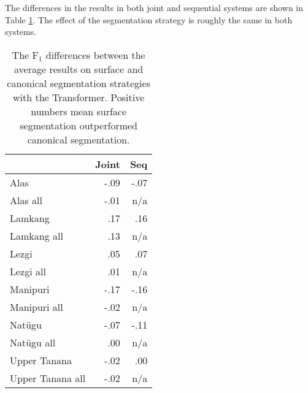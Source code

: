 The differences in the results in both joint and sequential systems are shown in Table \ref{tab:segdiffresults}. The effect of the segmentation strategy is roughly the same in both systems. 

\begin{table}[!tb]
    \centering
    \begin{tabular}{l|r|r}
          & \textbf{Joint} & \textbf{Seq} \\
         \hline
         Alas  & -.09 &  -.07  \\
         Alas all & -.01 & n/a \\
         \hline
         Lamkang  & .17 & .16  \\
         Lamkang all & .13 & n/a \\
         \hline
         Lezgi  & .05 & .07  \\
         Lezgi all & .01 & n/a \\
         \hline
         Manipuri  & -.17 & -.16   \\
         Manipuri all & -.02 & n/a \\
         \hline
         Natügu  & -.07 & -.11  \\
         Natügu all & .00 & n/a \\
         \hline
         Upper Tanana & -.02 & .00 \\
         Upper Tanana all & -.02 & n/a \\
    \end{tabular}
    \caption[F$_1$-score Differences between Surface and Canonical Segmentation]{The F$_1$ differences between the average results on surface and canonical segmentation strategies with the Transformer. Positive numbers mean surface segmentation outperformed canonical segmentation.}
    \label{tab:segdiffresults}
\end{table}


